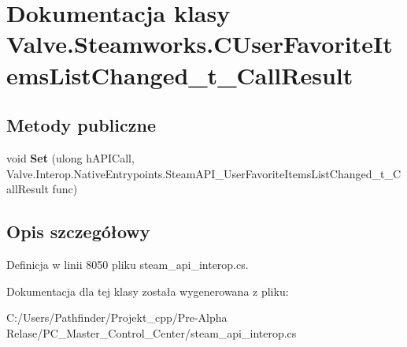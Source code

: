 \hypertarget{class_valve_1_1_steamworks_1_1_c_user_favorite_items_list_changed__t___call_result}{}\section{Dokumentacja klasy Valve.\+Steamworks.\+C\+User\+Favorite\+Items\+List\+Changed\+\_\+t\+\_\+\+Call\+Result}
\label{class_valve_1_1_steamworks_1_1_c_user_favorite_items_list_changed__t___call_result}
\subsection*{Metody publiczne}
\begin{DoxyCompactItemize}
\item 
\mbox{\label{class_valve_1_1_steamworks_1_1_c_user_favorite_items_list_changed__t___call_result_a21ddd7b1fb89532f0d95b3cf050c51fd}} 
void {\bfseries Set} (ulong h\+A\+P\+I\+Call, Valve.\+Interop.\+Native\+Entrypoints.\+Steam\+A\+P\+I\+\_\+\+User\+Favorite\+Items\+List\+Changed\+\_\+t\+\_\+\+Call\+Result func)
\end{DoxyCompactItemize}


\subsection{Opis szczegółowy}


Definicja w linii 8050 pliku steam\+\_\+api\+\_\+interop.\+cs.



Dokumentacja dla tej klasy została wygenerowana z pliku\+:\begin{DoxyCompactItemize}
\item 
C\+:/\+Users/\+Pathfinder/\+Projekt\+\_\+cpp/\+Pre-\/\+Alpha Relase/\+P\+C\+\_\+\+Master\+\_\+\+Control\+\_\+\+Center/steam\+\_\+api\+\_\+interop.\+cs\end{DoxyCompactItemize}
